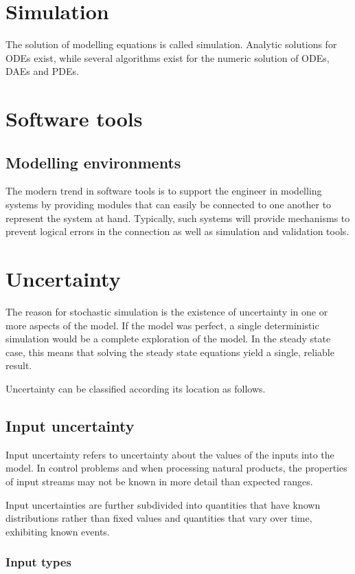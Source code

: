 \section{Simulation}
The solution of modelling equations is called simulation.  
Analytic solutions for ODEs exist, while several algorithms exist for the numeric solution of ODEs, DAEs and PDEs.

\section{Software tools}
\subsection{Modelling environments}
The modern trend in software tools is to support the engineer in modelling systems by providing modules that can easily be connected to one another to represent the system at hand.
Typically, such systems will provide mechanisms to prevent logical errors in the connection as well as simulation and validation tools.

\section{Uncertainty}
The reason for stochastic simulation is the existence of uncertainty in one or more aspects of the model.  
If the model was perfect, a single deterministic simulation would be a complete exploration of the model.  
In the steady state case, this means that solving the steady state equations yield a single, reliable result.  

Uncertainty can be classified according its location as follows.

\subsection{Input uncertainty}
Input uncertainty refers to uncertainty about the values of the inputs into the model.  
In control problems and when processing natural products, the properties of input streams may not be known in more detail than expected ranges.

Input uncertainties are further subdivided into quantities that have known distributions rather than fixed values and quantities that vary over time, exhibiting known events.

\subsubsection{Input types}

